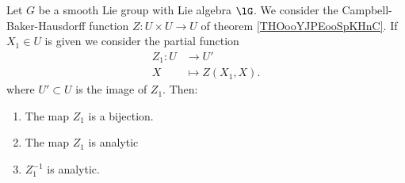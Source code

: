 \begin{lemma}	\label{LEMooFUXAooKZfHMl}
	Let \( G\) be a smooth Lie group with Lie algebra \( \lG\). We consider the Campbell-Baker-Hausdorff function \(Z \colon U\times U\to U  \) of theorem \ref{THOooYJPEooSpKHnC}. If \( X_1\in U\) is given we consider the partial function
	\begin{equation}
		\begin{aligned}
			Z_1\colon U & \to U'            \\
			X           & \mapsto Z(X_1,X).
		\end{aligned}
	\end{equation}
	where \( U'\subset U\) is the image of \( Z_1\). Then:
	\begin{enumerate}
		\item
		      The map \( Z_1\) is a bijection.
		\item
		      The map \( Z_1\) is analytic
		\item
		      \( Z_1^{-1}\) is analytic.
	\end{enumerate}
\end{lemma}

